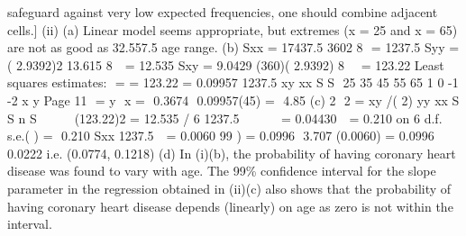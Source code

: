 \documentclass[a4paper,12pt]{article}
\begin{document}
safeguard against very low expected frequencies, one should combine
adjacent cells.]
(ii) (a)
Linear model seems appropriate, but extremes (x = 25 and x = 65) are
not as good as 32.557.5 age range.
(b) Sxx = 17437.5
3602
8  = 1237.5
Syy =
( 2.9392)2 13.615
8

 = 12.535
Sxy = 9.0429 (360)( 2.9392)
8

  = 123.22
Least squares estimates:
 = = 123.22 = 0.09957
1237.5
xy
xx
S
S 
25 35 45 55 65
1
0
-1
-2
x
y
Page 11
 = y  x =  0.3674  0.09957(45) =  4.85
(c)
2
 2 = xy /( 2)
yy
xx
S
S n
S
 
    
 
 
(123.22)2 = 12.535 / 6
1237.5
 
    
 
= 0.04430
  = 0.210 on 6 d.f.
s.e.(
) =
 0.210
Sxx 1237.5

 = 0.0060
99%
)
= 0.0996  3.707 (0.0060)
= 0.0996  0.0222 i.e. (0.0774, 0.1218)
(d) In (i)(b), the probability of having coronary heart disease was found to vary with age. The 99\% confidence interval for the slope parameter in the regression obtained in (ii)(c) also shows that the probability of having coronary heart disease depends (linearly) on age as zero is not within the interval.
\end{document}

